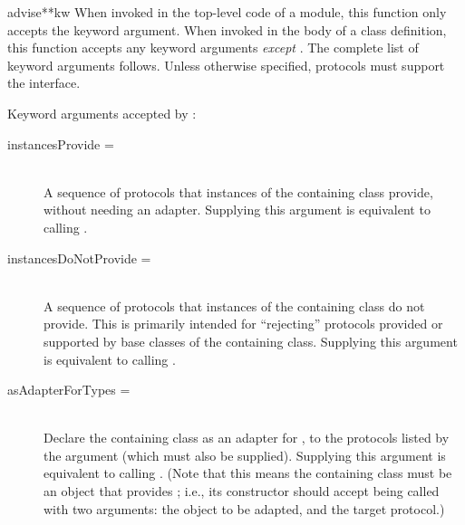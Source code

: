 \begin{verbatim%
}
\begin{verbatim%
}
\begin{verbatim%
}
\begin{verbatim%
}
\begin{funcdesc}{advise}{**kw}
When invoked in the top-level code of a module, this function only accepts
the  keyword argument.  When invoked in the body of a
class definition, this function accepts any keyword arguments \emph{except}
.  The complete list of keyword arguments follows.
Unless otherwise specified, protocols must support the 
interface.

\end{funcdesc}













Keyword arguments accepted by :

\begin{description}

\item[instancesProvide = ] \hfill \\
A sequence of protocols that instances of the containing class provide, without
needing an adapter.  Supplying this argument is equivalent to calling
.

\item[instancesDoNotProvide = ] \hfill \\
A sequence of protocols that instances of the containing class do not provide.
This is primarily intended for ``rejecting'' protocols provided or supported
by base classes of the containing class.  Supplying this argument is equivalent
to calling .

\item[asAdapterForTypes = ] \hfill \\
Declare the containing class as an adapter for , to the protocols
listed by the  argument (which must also be supplied).
Supplying this argument is equivalent to calling
.  (Note that this means the containing class must be an
object that provides ; i.e., its constructor should
accept being called with two arguments: the object to be adapted, and the
target protocol.)


\end{description}
\end{verbatim%
}
\end{verbatim%
}
\end{verbatim%
}
\end{verbatim%
}
